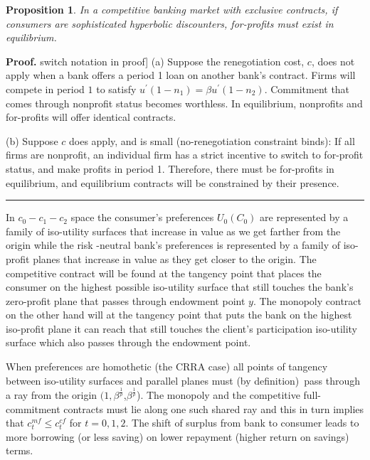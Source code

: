 \documentclass[11pt]{article}%
\newtheorem{proposition}{Proposition}
\newenvironment{proof}[1][Proof]{\noindent\textbf{#1.} }{\ \rule{0.5em}{0.5em}}
\begin{document}
\begin{proposition}
In a competitive banking market with exclusive contracts, if consumers are
sophisticated hyperbolic discounters, for-profits must exist in equilibrium.
\end{proposition}

\begin{proof}
\lbrack switch notation in proof] (a) Suppose the renegotiation cost, $c$,
does not apply when a bank offers a period 1 loan on another bank's contract.
Firms will compete in period $1$ to satisfy $u^{\prime}\left(  1-n_{1}\right)
=\beta u^{\prime}\left(  1-n_{2}\right)  $. Commitment that comes through
nonprofit status becomes worthless. In equilibrium, nonprofits and for-profits
will offer identical contracts.

(b) Suppose $c$ does apply, and is small (no-renegotiation constraint binds):
If all firms are nonprofit, an individual firm has a strict incentive to
switch to for-profit status, and make profits in period 1. Therefore, there
must be for-profits in equilibrium, and equilibrium contracts will be
constrained by their presence.
\end{proof}



In $c_{0}-c_{1}-c_{2}$ space  the consumer's preferences \(U_{0}(C_{0})\)  are represented by a family of iso-utility surfaces
that increase in value as we get farther from the origin while the risk
-neutral bank's preferences is represented by a family of iso-profit planes that increase in value as they get closer to the origin. The competitive contract will be found at the tangency point   that places  the consumer on the highest possible iso-utility surface that still touches the bank's zero-profit plane that  passes through  endowment point \(y. \) The monopoly contract on the other hand will at the tangency point that puts the bank on the highest iso-profit plane it can reach that  still touches the client's participation iso-utility surface which also passes through the endowment point. 



When preferences are homothetic (the CRRA case)
all points of tangency between iso-utility surfaces and parallel planes must (by definition)\ pass through a ray from the origin \((1,\beta^{\frac{1}{\rho}}\),\(\beta^{\frac{1}{\rho}}\)). The monopoly and the competitive full-commitment contracts must lie along one such shared ray and this in turn implies that \(c^{mf}_{t} \leq c^{cf}_{t}\) for \(t=0,1,2  \). The shift of surplus from bank to consumer leads to more borrowing  (or less saving)
on lower repayment (higher return on savings) terms.
\end{document}
